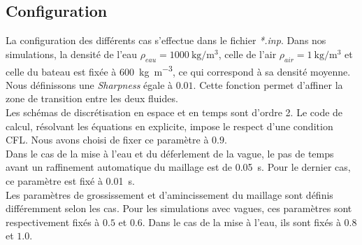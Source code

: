 \documentclass[../main.tex]{subfiles}
\begin{document}
\subsection{Configuration}


La configuration des différents cas s'effectue dans le fichier \textit{*.inp}. Dans nos simulations, la densité de l'eau $\rho_{eau} = \qty{1000}{\kilogram\per\cubic\meter}$, celle de l'air $\rho_{air} = \qty{1}{\kilogram\per\cubic\meter}$ et celle du bateau est fixée à \qty{600}{\kilogram\per\cubic\meter}, ce qui correspond à sa densité moyenne.\\

Nous définissons une \textit{Sharpness} égale à $0.01$. Cette fonction permet d'affiner la zone de transition entre les deux fluides.\\

Les schémas de discrétisation en espace et en temps sont d'ordre 2. Le code de calcul, résolvant les équations en explicite, impose le respect d'une condition CFL. Nous avons choisi de fixer ce paramètre à $0.9$.\\

Dans le cas de la mise à l'eau et du déferlement de la vague, le pas de temps avant un raffinement automatique du maillage est de \qty{0.05}{\second}. Pour le dernier cas, ce paramètre est fixé à \qty{0.01}{\second}.\\

Les paramètres de grossissement et d'amincissement du maillage sont définis différemment selon les cas. Pour les simulations avec vagues, ces paramètres sont respectivement fixés à $0.5$ et $0.6$. Dans le cas de la mise à l'eau, ils sont fixés à $0.8$ et $1.0$.
\end{document}
